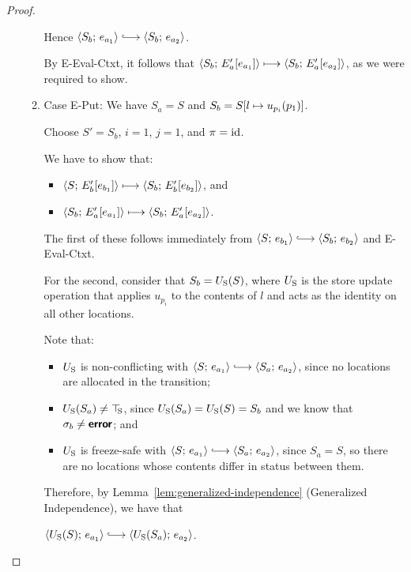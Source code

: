 \begin{proof}
\begin{enumerate}
\begin{enumerate}
      Hence $\config{S_b}{e_{a_1}} \parstepsto \config{S_b}{e_{a_2}}$.

      By {\sc E-Eval-Ctxt}, it follows that
      $\langle S_b;\, E'_a\hspace{-0.5mm}\left[e_{a_1}\right] \rangle \longmapsto
      \langle S_b;\, E'_a\hspace{-0.5mm}\left[e_{a_2}\right] \rangle$,
      as we were required to show.

    \item \label{slqc-beta-put}Case {\sc E-Put}: We have $S_a = S$ and
      $S_b = S[l \mapsto u_{p_i}(p_1)]$.

      Choose $S' = S_b$, $i = 1$, $j = 1$, and $\pi = \mathrm{id}$.

      We have to show that:
      \begin{itemize}
      \item $\langle S;\, E'_b\hspace{-0.5mm}\left[e_{b_1}\right] \rangle \longmapsto
        \langle S_b;\, E'_b\hspace{-0.5mm}\left[e_{b_2}\right] \rangle$, and
      \item $\langle S_b;\, E'_a\hspace{-0.5mm}\left[e_{a_1}\right] \rangle \longmapsto
        \langle S_b;\, E'_a\hspace{-0.5mm}\left[e_{a_2}\right] \rangle$.
      \end{itemize}

      The first of these follows immediately from $\config{S}{e_{b_1}}
      \parstepsto \config{S_b}{e_{b_2}}$ and {\sc E-Eval-Ctxt}.

      For the second, consider that $S_b = U_{\mathrm{S}}(S)$, where $U_{\mathrm{S}}$ is the
      store update operation that applies $u_{p_i}$ to the contents of
      $l$ and acts as the identity on all other locations.

      Note that:
      \begin{itemize}
      \item $U_{\mathrm{S}}$ is non-conflicting with $\config{S}{e_{a_1}}
        \parstepsto \config{S_a}{e_{a_2}}$, since no locations are
        allocated in the transition;
      \item $U_{\mathrm{S}}(S_a) \neq \top\hspace{-0.85mm}_{\mathrm{S}}$, since $U_{\mathrm{S}}(S_a) = U_{\mathrm{S}}(S) = S_b$
        and we know that $\sigma_b \neq \textbf{\textsf{error}}$; and
      \item $U_{\mathrm{S}}$ is freeze-safe with $\config{S}{e_{a_1}}
        \parstepsto \config{S_a}{e_{a_2}}$, since $S_a = S$, so
        there are no locations whose contents differ in status
        between them.
      \end{itemize}

      Therefore, by Lemma~\ref{lem:generalized-independence}
      (Generalized Independence), we have that

      $\config{\Ustore(S)}{e_{a_1}} \parstepsto
      \config{\Ustore(S_a)}{e_{a_2}}$.


\end{enumerate}
\end{enumerate}
\end{proof}
